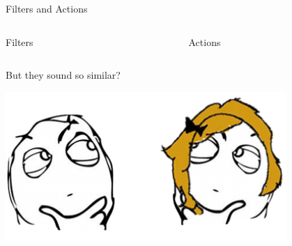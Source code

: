 \documentclass[10pt]{beamer}
\begin{document}
    \begin{frame}{Filters and Actions}
        \begin{columns}
            \begin{column}{0.5\textwidth}
                \begin{center}
                    \begin{Huge}
                        Filters
                    \end{Huge}
                \end{center}                    
                \begin{figure}
                
                \end{figure}
            \end{column}
            \begin{column}{0.5\textwidth}
                \begin{center}
                    \begin{Huge}
                        Actions
                    \end{Huge}
                \end{center}                    
                \begin{figure}
                
                \end{figure}
            \end{column}
        \end{columns}
    \end{frame}

    \begin{frame}
        \begin{center}
            \begin{Huge}
                But they sound so similar?
            \end{Huge}

            \vfill{}
            \includegraphics[width=0.8\textwidth]{images/similar}
        \end{center}
    \end{frame}
\end{document}
